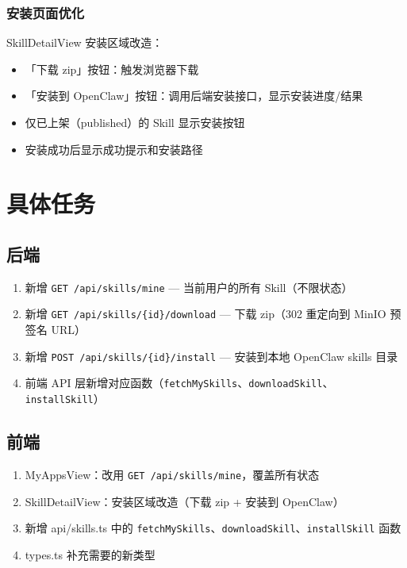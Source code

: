 \documentclass[11pt,a4paper]{article}
\begin{document}
\subsubsection{安装页面优化}

SkillDetailView 安装区域改造：
\begin{itemize}[nosep]
  \item 「下载 zip」按钮：触发浏览器下载
  \item 「安装到 OpenClaw」按钮：调用后端安装接口，显示安装进度/结果
  \item 仅已上架（published）的 Skill 显示安装按钮
  \item 安装成功后显示成功提示和安装路径
\end{itemize}

\section{具体任务}

\subsection{后端}

\begin{enumerate}[nosep]
  \item 新增 \texttt{GET /api/skills/mine} --- 当前用户的所有 Skill（不限状态）
  \item 新增 \texttt{GET /api/skills/\{id\}/download} --- 下载 zip（302 重定向到 MinIO 预签名 URL）
  \item 新增 \texttt{POST /api/skills/\{id\}/install} --- 安装到本地 OpenClaw skills 目录
  \item 前端 API 层新增对应函数（\texttt{fetchMySkills}、\texttt{downloadSkill}、\texttt{installSkill}）
\end{enumerate}

\subsection{前端}

\begin{enumerate}[nosep]
  \item MyAppsView：改用 \texttt{GET /api/skills/mine}，覆盖所有状态
  \item SkillDetailView：安装区域改造（下载 zip + 安装到 OpenClaw）
  \item 新增 api/skills.ts 中的 \texttt{fetchMySkills}、\texttt{downloadSkill}、\texttt{installSkill} 函数
  \item types.ts 补充需要的新类型
\end{enumerate}
\end{document}
